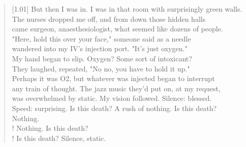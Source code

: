 \begin{verse}[1.01\textwidth]
  But then I was in. I was in that room with surprisingly green walls.\\
  The nurses dropped me off, and from down those hidden halls\\
  came surgeon, anaesthesiologist, what seemed like dozens of people.\\
  "Here, hold this over your face," someone said as a needle\\
  wandered into my IV's injection port. "It's just oxygen."\\
  My hand began to slip. Oxygen? Some sort of intoxicant?\\
  They laughed, repeated, "No no, you have to hold it up."\\
  Perhaps it was O2, but whatever was injected began to interrupt\\
  any train of thought. The jazz music they'd put on, at my request,\\
  was overwhelmed by static. My vision followed. Silence: blessed.\\
  Speed: surprising. Is this death? A rush of nothing. Is this death?\\
  Nothing.\\!
   Nothing. Is this death?\\!
   Is this death?
  Silence, static.
\end{verse}
